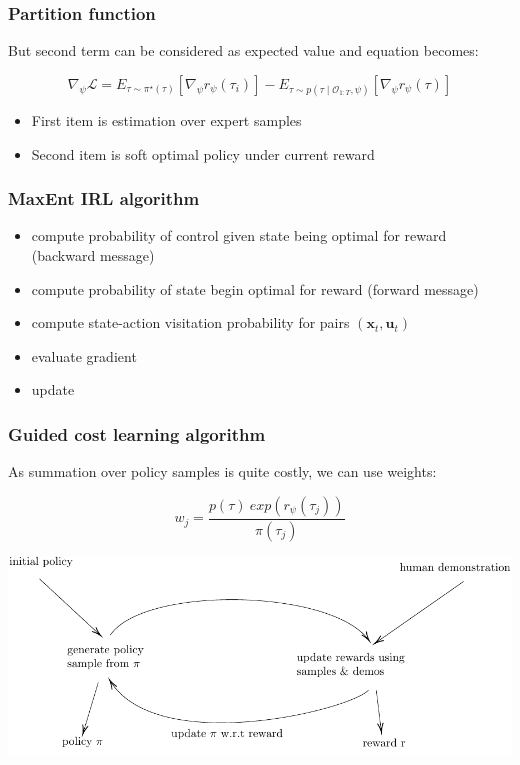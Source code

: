 \begin{frame}
    \frametitle{Partition function}

    But second term can be considered as expected value and equation becomes:


    \begin{equation}
        \nabla_\psi \mathcal{L}=E_{\tau \sim \pi^{\star}(\tau)}\left[\nabla_\psi r_\psi\left(\tau_i\right)\right]-E_{\tau \sim p\left(\tau \mid \mathcal{O}_{1: T}, \psi\right)}\left[\nabla_\psi r_\psi(\tau)\right]
    \end{equation}

    \begin{itemize}
        \item First item is estimation over expert samples
        \item Second item is soft optimal policy under current reward
    \end{itemize}
\end{frame}

\begin{frame}
    \frametitle{MaxEnt IRL algorithm \cite{ziebart_maximum_nodate}}

    \begin{itemize}
        \item compute probability of control given state being optimal for reward (backward message)
        \item compute probability of state begin optimal for reward (forward message)
        \item compute state-action visitation probability for pairs $(\mathbf{x}_t, \mathbf{u}_t)$
        \item evaluate gradient
        \item update
    \end{itemize}
\end{frame}

\begin{frame}
    \frametitle{Guided cost learning algorithm \cite{finn_guided_2016}}

    As summation over policy samples is quite costly, we can use weights:

    \begin{equation}
        w_j= \frac{p(\tau)\ exp(r_\psi(\tau_j))}{\pi(\tau_j)}
    \end{equation}

    \begin{center}
        \includegraphics[width=0.7\linewidth]{content/tikz/guided_cost.pdf}
    \end{center}
\end{frame}